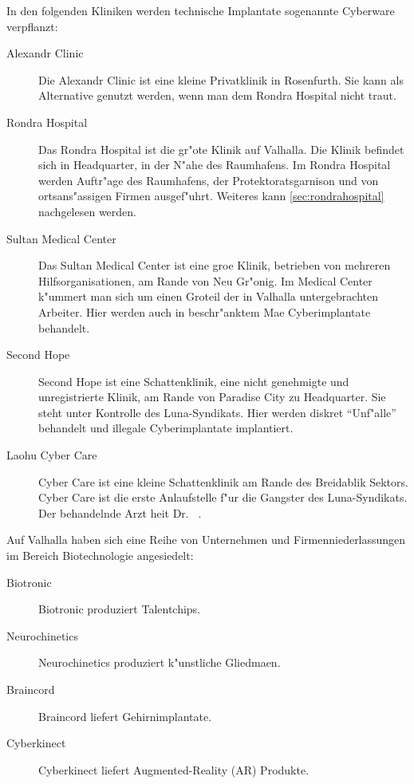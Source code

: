 
In den folgenden Kliniken werden technische Implantate sogenannte Cyberware verpflanzt:

\begin{description}
    \item [Alexandr Clinic] Die Alexandr Clinic ist eine kleine Privatklinik in Rosenfurth. Sie kann als Alternative genutzt werden, wenn 
        man dem Rondra Hospital nicht traut.
    \item [Rondra Hospital] Das Rondra Hospital ist die gr"o\3te Klinik auf Valhalla. Die Klinik befindet sich in Headquarter, in der N"ahe 
        des Raumhafens. Im Rondra Hospital werden Auftr"age des Raumhafens, der Protektoratsgarnison und von ortsans"assigen Firmen ausgef"uhrt. Weiteres kann \cref{sec:rondrahospital} nachgelesen werden. 
    \item [Sultan Medical Center] Das Sultan Medical Center ist eine gro\3e Klinik, betrieben von mehreren Hilfsorganisationen, am Rande 
        von Neu Gr"onig. Im Medical Center k"ummert man sich um einen Gro\3teil der in Valhalla untergebrachten Arbeiter. Hier werden auch in beschr"anktem Ma\3e Cyberimplantate behandelt.
    \item [Second Hope] Second Hope ist eine Schattenklinik, eine nicht genehmigte und unregistrierte Klinik, am Rande von Paradise City zu 
        Headquarter. Sie steht unter Kontrolle des Luna-Syndikats. Hier werden diskret ``Unf"alle'' behandelt und illegale Cyberimplantate implantiert.
    \item [Laohu Cyber Care]  Cyber Care ist eine kleine Schattenklinik am Rande des Breidablik Sektors. Cyber 
        Care ist die erste Anlaufstelle f"ur die Gangster des Luna-Syndikats. Der behandelnde Arzt hei\3t Dr.~ .
\end{description}


Auf Valhalla haben sich eine Reihe von Unternehmen und Firmenniederlassungen im Bereich Biotechnologie angesiedelt:

\begin{description}
    \item [Biotronic] Biotronic produziert Talentchips.
    \item [Neurochinetics] Neurochinetics produziert k"unstliche Gliedma\3en.
    \item [Braincord]  Braincord liefert Gehirnimplantate.
    \item [Cyberkinect] Cyberkinect liefert Augmented-Reality (AR) Produkte.
\end{description}

